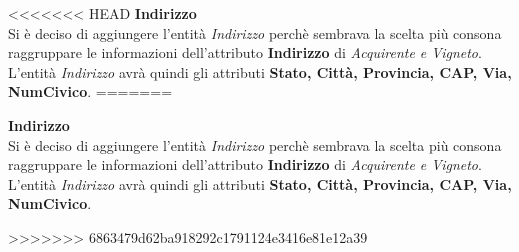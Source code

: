 <<<<<<< HEAD
\textbf{\large{Indirizzo}}\\
Si è deciso di aggiungere l'entità \emph{Indirizzo} perchè sembrava la scelta più consona raggruppare le informazioni dell'attributo \textbf{Indirizzo} di \emph{Acquirente e Vigneto}. L'entità \emph{Indirizzo} avrà quindi gli attributi \textbf{Stato, Città, Provincia, CAP, Via, NumCivico}.
=======
\begin{flushleft}
	\textbf{\large{Indirizzo}}\\
	Si è deciso di aggiungere l'entità \emph{Indirizzo} perchè sembrava la scelta più consona raggruppare le informazioni dell'attributo \textbf{Indirizzo} di \emph{Acquirente e Vigneto}. L'entità \emph{Indirizzo} avrà quindi gli attributi \textbf{Stato, Città, Provincia, CAP, Via, NumCivico}.
\end{flushleft}
>>>>>>> 6863479d62ba918292c1791124e3416e81e12a39
